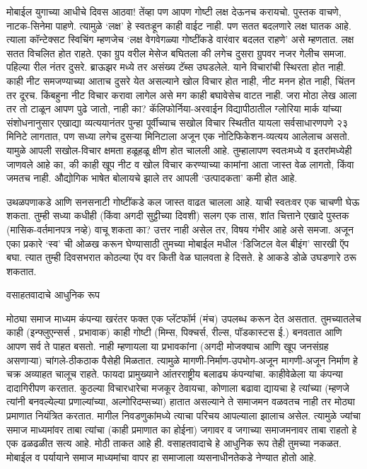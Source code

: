 मोबाईल युगाच्या आधीचे दिवस आठवा! तेंव्हा पण आपण गोष्टी लक्ष देऊनच करायचो. पुस्तक वाचणे, नाटक-सिनेमा पाहणे. त्यामुळे ‘लक्ष’ हे स्वतःहून काही वाईट नाही. पण सतत बदलणारे लक्ष घातक आहे. त्याला कॉन्टेक्सट स्विचिंग म्हणजेच ‘लक्ष वेगवेगळ्या गोष्टींकडे वारंवार बदलत राहणे’ असे म्हणतात. लक्ष सतत विचलित होत राहते. एका ग्रुप वरील मेसेज बघितला की लगेच दुसरा ग्रुपवर नजर गेलीच समजा. पहिल्या रील नंतर दुसरे. ब्राऊझर मध्ये तर असंख्य टॅब्स उघडलेले. याने विचारांची स्थिरता होत नाही. काही नीट समजण्याच्या आताच दुसरे येत असल्याने खोल विचार होत नाही, नीट मनन होत नाही, चिंतन तर दूरच. किंबहुना नीट विचार करावा लागेल असे मग काही बघावेसेच वाटत नाही. जरा मोठा लेख आला तर तो टाळून आपण पुढे जातो, नाही का? कॅलिफोर्निया-अरवाईन विद्यापीठातील ग्लोरिया मार्क यांच्या संशोधनानुसार एखाद्या व्यत्ययानंतर पुन्हा पूर्वीच्याच सखोल विचार स्थितीत यायला सर्वसाधारणपणे २३ मिनिटे लागतात, पण सध्या लगेच दुसऱ्या मिनिटाला अजून एक नोटिफिकेशन-व्यत्यय आलेलाच असतो. यामुळे आपली सखोल-विचार क्षमता हळूहळू क्षीण होत चालली आहे. तुम्हालापण स्वतःमध्ये व इतरांमध्येही जाणवले आहे का, की काही खूप नीट व खोल विचार करण्याच्या कामांना आता जास्त वेळ लागतो, किंवा जमतच नाही. औद्योगिक भाषेत बोलायचे झाले तर आपली ‘उत्पादकता’ कमी होत आहे.

उथळपणाकडे आणि सनसनाटी गोष्टींकडे कल जास्त वाढत चालला आहे. याची स्वतःवर एक चाचणी घेऊ शकता. तुम्ही सध्या कधीही (किंवा अगदी सुट्टीच्या दिवशी) सलग एक तास, शांत चित्ताने एखादे पुस्तक (मासिक-वर्तमानपत्र नव्हे) वाचू शकता का? उत्तर नाही असेल तर, विषय गंभीर आहे असे समजा. अजून एका प्रकारे ‘स्व’ ची ओळख करून घेण्यासाठी तुमच्या मोबाईल मधील ‘डिजिटल वेल बीइंग’ सारखी ऍप बघा. त्यात तुम्ही दिवसभरात कोठल्या ऍप वर किती वेळ घालवता हे दिसते. हे आकडे डोळे उघडणारे ठरू शकतात.

वसाहतवादाचे आधुनिक रूप

मोठ्या समाज माध्यम कंपन्या खरंतर फक्त एक प्लॅटफॉर्म (मंच) उपलब्ध करून देत असतात. तुमच्यातलेच काही (इन्फ्लुएन्सर्स , प्रभावाक) काही गोष्टी (मिम्स, पिक्चर्स, रील्स, पॉडकास्टस ई.) बनवतात आणि आपण सर्व ते पाहत बसतो. नाही म्हणायला या प्रभावकांना (अगदी मोजक्याच आणि खूप जनसंग्रह असणाऱ्या) चांगले-ठीकठाक पैसेही मिळतात. त्यामुळे मागणी-निर्माण-उपभोग-अजून मागणी-अजून निर्माण हे चक्र अव्याहत चालूच राहते. फायदा प्रामुख्याने आंतरराष्ट्रीय बलाढ्य कंपन्यांचा. काहीवेळेला या कंपन्या दादागिरीपण करतात. कुठल्या विचारधारेचा मजकूर ठेवायचा, कोणाला बढावा द्यायचा हे त्यांच्या (म्हणजे त्यांनी बनवल्येल्या प्रणाल्यांच्या, अल्गोरिदम्सच्या) हातात असल्याने ते समाजमन वळवतच नाही तर मोठ्या प्रमाणात नियंत्रित करतात. मागील निवडणुकांमध्ये त्याचा परिचय आपल्याला झालाच असेल. त्यामुळे ज्यांचा समाज माध्यमांवर ताबा त्यांचा (काही प्रमाणात का होईना) जगावर व जगाच्या समाजमनावर ताबा राहतो हे एक ढळढळीत सत्य आहे. मोठी ताकत आहे ही. वसाहतवादाचे हे आधुनिक रूप तेही तुमच्या नकळत. मोबाईल व पर्यायाने समाज माध्यमांचा वापर हा समाजाला व्यसनाधीनतेकडे नेण्यात होतो आहे.

